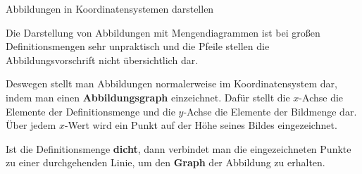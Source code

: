 \documentclass[../../main.tex]{subfiles}
\begin{document}
\begin{nutshell}{Abbildungen in Koordinatensystemen darstellen}
    
    Die Darstellung von Abbildungen mit Mengendiagrammen ist bei großen Definitionsmengen sehr unpraktisch und die Pfeile stellen die Abbildungsvorschrift nicht übersichtlich dar.
    
    Deswegen stellt man Abbildungen normalerweise im Koordinatensystem dar, indem man einen \textbf{Abbildungsgraph} einzeichnet. Dafür stellt die $x$-Achse die Elemente der Definitionsmenge und die $y$-Achse die Elemente der Bildmenge dar. Über jedem $x$-Wert wird ein Punkt auf der Höhe seines Bildes eingezeichnet. 
    
    Ist die Definitionsmenge \textbf{dicht}, dann verbindet man die eingezeichneten Punkte zu einer durchgehenden Linie, um den \textbf{Graph} der Abbildung zu erhalten.
\end{nutshell}
\end{document}

